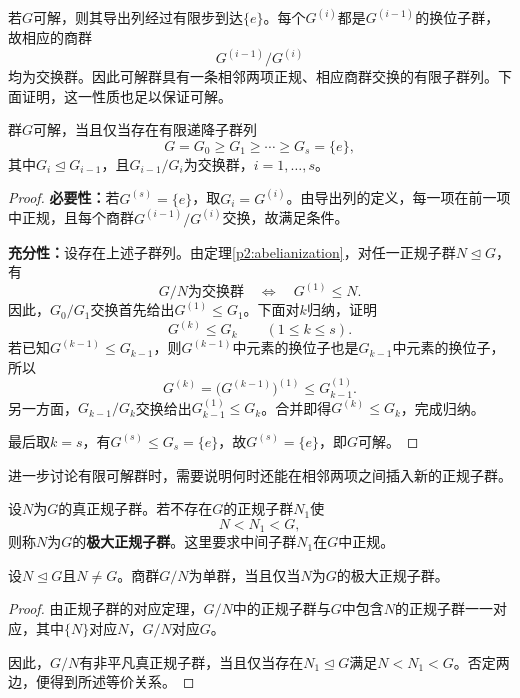 若$G$可解，则其导出列经过有限步到达$\{e\}$。每个$G^{(i)}$都是$G^{(i-1)}$的换位子群，故相应的商群
\[
G^{(i-1)}/G^{(i)}
\]
均为交换群。因此可解群具有一条相邻两项正规、相应商群交换的有限子群列。下面证明，这一性质也足以保证可解。

\begin{theorem}\label{p2:solvable-series}
群$G$可解，当且仅当存在有限递降子群列
\[
G=G_0\geq G_1\geq\cdots\geq G_s=\{e\},
\]
其中$G_i\trianglelefteq G_{i-1}$，且$G_{i-1}/G_i$为交换群，$i=1,\ldots,s$。
\end{theorem}
\begin{proof}
\textbf{必要性：}若$G^{(s)}=\{e\}$，取$G_i=G^{(i)}$。由导出列的定义，每一项在前一项中正规，且每个商群$G^{(i-1)}/G^{(i)}$交换，故满足条件。

\textbf{充分性：}设存在上述子群列。由定理\ref{p2:abelianization}，对任一正规子群$N\trianglelefteq G$，有
\[
G/N\text{为交换群}\quad\Longleftrightarrow\quad G^{(1)}\leq N.
\]
因此，$G_0/G_1$交换首先给出$G^{(1)}\leq G_1$。下面对$k$归纳，证明
\[
G^{(k)}\leq G_k\qquad(1\leq k\leq s).
\]
若已知$G^{(k-1)}\leq G_{k-1}$，则$G^{(k-1)}$中元素的换位子也是$G_{k-1}$中元素的换位子，所以
\[
G^{(k)}=\bigl(G^{(k-1)}\bigr)^{(1)}\leq G_{k-1}^{(1)}.
\]
另一方面，$G_{k-1}/G_k$交换给出$G_{k-1}^{(1)}\leq G_k$。合并即得$G^{(k)}\leq G_k$，完成归纳。

最后取$k=s$，有$G^{(s)}\leq G_s=\{e\}$，故$G^{(s)}=\{e\}$，即$G$可解。
\end{proof}

进一步讨论有限可解群时，需要说明何时还能在相邻两项之间插入新的正规子群。

\begin{definition}
\label{p2:concept:c2-l617}设$N$为$G$的真正规子群。若不存在$G$的正规子群$N_1$使
\[
N<N_1<G,
\]
则称$N$为$G$的\textbf{极大正规子群}。这里要求中间子群$N_1$在$G$中正规。
\end{definition}

\begin{proposition}
设$N\trianglelefteq G$且$N\ne G$。商群$G/N$为单群，当且仅当$N$为$G$的极大正规子群。
\end{proposition}
\begin{proof}
由正规子群的对应定理，$G/N$中的正规子群与$G$中包含$N$的正规子群一一对应，其中$\{N\}$对应$N$，$G/N$对应$G$。

因此，$G/N$有非平凡真正规子群，当且仅当存在$N_1\trianglelefteq G$满足$N<N_1<G$。否定两边，便得到所述等价关系。
\end{proof}

